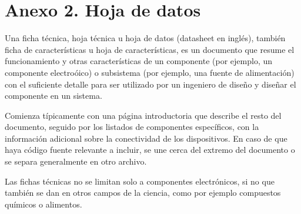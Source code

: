 \chapter{Anexo 2. Hoja de datos}\label{anexo2}

Una ficha técnica, hoja técnica u hoja de datos (datasheet en inglés), también ficha de características u hoja de características, es un documento que resume el funcionamiento y otras características de un componente (por ejemplo, un componente electroóico) o subsistema (por ejemplo, una fuente de alimentación) con el suficiente detalle para ser utilizado por un ingeniero de diseño y diseñar el componente en un sistema.

Comienza típicamente con una página introductoria que describe el resto del documento, seguido por los listados de componentes específicos, con la información adicional sobre la conectividad de los dispositivos. En caso de que haya código fuente relevante a incluir, se une cerca del extremo del documento o se separa generalmente en otro archivo.

Las fichas técnicas no se limitan solo a componentes electrónicos, si no que también se dan en otros campos de la ciencia, como por ejemplo compuestos químicos o alimentos.




\bigskip



\endinput 